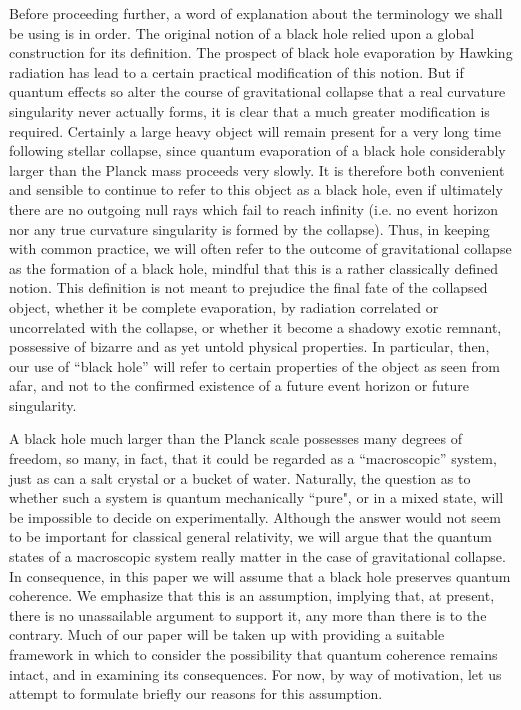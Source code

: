 Before proceeding further, a word of explanation about the terminology
we shall be using is in order.  The original notion of a black hole
relied upon a global construction for its definition.  The prospect of
black hole evaporation by Hawking radiation has lead to a certain
practical modification of this notion.  But if quantum effects so alter
the course of gravitational collapse that a real curvature singularity
never actually forms, it is clear that a much greater modification is
required.  Certainly a large heavy object will remain present for a
very long time following stellar collapse, since quantum evaporation of
a black hole considerably larger than the Planck mass proceeds very
slowly. It is therefore both convenient and sensible to continue to
refer to this object as a black hole, even if ultimately there are no
outgoing null rays which fail to reach infinity (i.e. no event horizon
nor any true curvature singularity is formed by the collapse).
Thus, in keeping with common practice, we will often refer to the
outcome of gravitational collapse as the formation of a black hole,
mindful that this is a rather classically defined notion. This
definition is not meant to prejudice the final fate of the collapsed
object, whether it be complete evaporation, by radiation correlated or
uncorrelated with the collapse, or whether it become a shadowy exotic
remnant, possessive of bizarre and as yet untold physical properties.
In particular, then, our use of ``black hole'' will refer to certain
properties of the object as seen from afar, and not to the confirmed
existence of a future event horizon or future singularity.

A black hole much larger than the Planck scale possesses many degrees
of freedom, so many, in fact, that it could be regarded as  a
``macroscopic'' system, just as can a salt crystal or a bucket of
water.  Naturally, the question as to whether such a system is quantum
mechanically ``pure", or in a mixed state, will be impossible to decide
on experimentally.  Although the answer would not seem to be important
for classical general relativity, we will argue that the quantum states
of a macroscopic system really matter in the case of gravitational
collapse. In consequence, in this paper we will assume that a black
hole preserves quantum coherence. We emphasize that this is an
assumption, implying that, at present, there is no unassailable
argument to support it, any more than there is to the contrary. Much of
our paper will be taken up with providing a suitable framework in which
to consider the possibility  that quantum coherence remains intact, and
in examining its consequences. For now, by way of motivation, let us
attempt to formulate briefly our reasons for this assumption.

